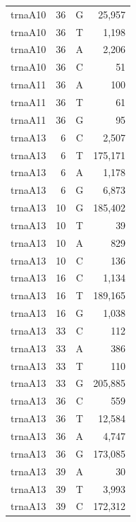 \documentclass[12pt]{rockefeller}
\begin{document}
\begin{tiny}
\begin{longtable}{|l|r|c|r|}
 trnaA10 &        36 &          G &     25,957 \\
 trnaA10 &        36 &          T &      1,198 \\
 trnaA10 &        36 &          A &      2,206 \\
 trnaA10 &        36 &          C &         51 \\
 trnaA11 &        36 &          A &        100 \\
 trnaA11 &        36 &          T &         61 \\
 trnaA11 &        36 &          G &         95 \\
 trnaA13 &         6 &          C &      2,507 \\
 trnaA13 &         6 &          T &    175,171 \\
 trnaA13 &         6 &          A &      1,178 \\
 trnaA13 &         6 &          G &      6,873 \\
 trnaA13 &        10 &          G &    185,402 \\
 trnaA13 &        10 &          T &         39 \\
 trnaA13 &        10 &          A &        829 \\
 trnaA13 &        10 &          C &        136 \\
 trnaA13 &        16 &          C &      1,134 \\
 trnaA13 &        16 &          T &    189,165 \\
 trnaA13 &        16 &          G &      1,038 \\
 trnaA13 &        33 &          C &        112 \\
 trnaA13 &        33 &          A &        386 \\
 trnaA13 &        33 &          T &        110 \\
 trnaA13 &        33 &          G &    205,885 \\
 trnaA13 &        36 &          C &        559 \\
 trnaA13 &        36 &          T &     12,584 \\
 trnaA13 &        36 &          A &      4,747 \\
 trnaA13 &        36 &          G &    173,085 \\
 trnaA13 &        39 &          A &         30 \\
 trnaA13 &        39 &          T &      3,993 \\
 trnaA13 &        39 &          C &    172,312 \\

\end{longtable}
\end{tiny}
\end{document}
